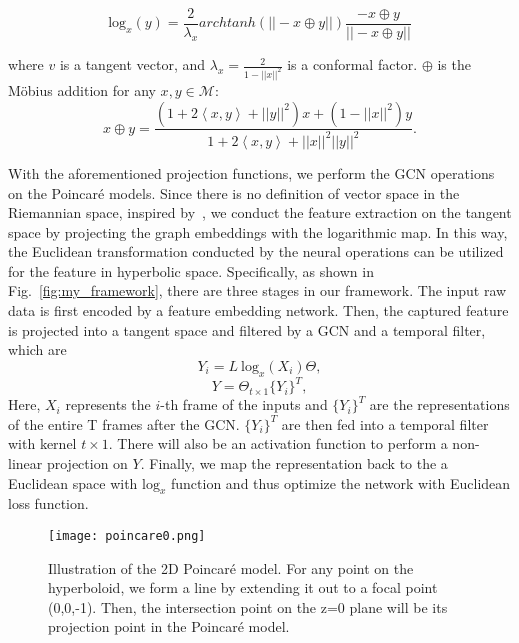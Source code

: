 \documentclass[letterpaper]{article} \usepackage{aaai19}  \usepackage{times}  \usepackage{helvet} \usepackage{courier}  \usepackage[hyphens]{url}  \usepackage{graphicx} \urlstyle{rm} \def\UrlFont{\rm}  \usepackage{graphicx}  \frenchspacing  \setlength{\pdfpagewidth}{8.5in}  \setlength{\pdfpageheight}{11in}
\begin{document}
\begin{equation}
    \text{log}_x(y) = \frac{2}{\lambda_x}archtanh(||-x\oplus y||)\frac{-x\oplus y}{||-x\oplus y||}
\end{equation}

\noindent where $v$ is a tangent vector, and $\lambda_x = \frac{2}{1-||x||^{2}}$ is a conformal factor. $\oplus$ is the Möbius addition for any $x,y \in \mathcal{M}$:
\begin{equation}
    x\oplus y = \frac{(1+2\left \langle x,y  \right \rangle+||y||^2)x+(1-||x||^2)y}{1+2\left \langle x,y  \right \rangle +||x||^2||y||^2}.
\end{equation}


With the aforementioned projection functions, we perform the GCN operations on the Poincar\'e models. Since there is no definition of vector space in the Riemannian space, inspired by~\cite{ganea2018hyperbolic}, we conduct the feature extraction on the tangent space by projecting the graph embeddings with the logarithmic map. In this way, the Euclidean transformation conducted by the neural operations can be utilized for the feature in hyperbolic space. Specifically, as shown in Fig.~\ref{fig:my_framework}, there are three stages in our framework. The input raw data is first encoded by a feature embedding network. Then, the captured feature is projected into a tangent space and filtered by a GCN and a temporal filter, which are
\begin{equation}
    Y_i = \mathit{L}~\text{log}_x(\mathit{X_i})\Theta,
\end{equation}
\begin{equation}
    Y = \Theta_{t\times 1}\{Y_i\}^T,
\end{equation}
Here, $X_i$ represents the $i$-th frame of the inputs and $\{Y_i\}^T$ are the representations of the entire T frames after the GCN. $\{Y_i\}^T$ are then fed into a temporal filter with kernel $t \times 1$. There will also be an activation function to perform a non-linear projection on $Y$. Finally, we map the representation back to the a Euclidean space with $\text{log}_x$ function and thus optimize the network with Euclidean loss function. 
\begin{figure}
    \centering
    \texttt{[image: poincare0.png]}
    \caption{Illustration of the 2D Poincar\'e model. For any point on the hyperboloid, we form a line by extending it out to a focal point (0,0,-1). Then, the intersection point on the z=0 plane will be its projection point in the Poincar\'e model.}
    \label{fig:poincare}
\end{figure}
\end{document}
